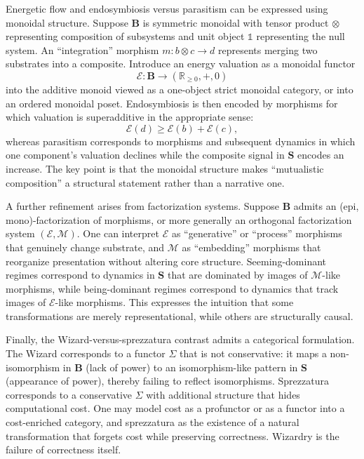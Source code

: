 \documentclass[11pt]{article}
\begin{document}
Energetic flow and endosymbiosis versus parasitism can be expressed using monoidal structure. Suppose $\mathbf{B}$ is symmetric monoidal with tensor product $\otimes$ representing composition of subsystems and unit object $\mathbb{1}$ representing the null system. An ``integration'' morphism $m:b\otimes c\to d$ represents merging two substrates into a composite. Introduce an energy valuation as a monoidal functor
\[
\mathcal{E}:\mathbf{B}\to (\mathbb{R}_{\ge 0}, +, 0)
\]
into the additive monoid viewed as a one-object strict monoidal category, or into an ordered monoidal poset. Endosymbiosis is then encoded by morphisms for which valuation is superadditive in the appropriate sense:
\[
\mathcal{E}(d) \ge \mathcal{E}(b)+\mathcal{E}(c),
\]
whereas parasitism corresponds to morphisms and subsequent dynamics in which one component’s valuation declines while the composite signal in $\mathbf{S}$ encodes an increase. The key point is that the monoidal structure makes ``mutualistic composition'' a structural statement rather than a narrative one.

A further refinement arises from factorization systems. Suppose $\mathbf{B}$ admits an (epi, mono)-factorization of morphisms, or more generally an orthogonal factorization system $(\mathcal{E},\mathcal{M})$. One can interpret $\mathcal{E}$ as ``generative'' or ``process'' morphisms that genuinely change substrate, and $\mathcal{M}$ as ``embedding'' morphisms that reorganize presentation without altering core structure. Seeming-dominant regimes correspond to dynamics in $\mathbf{S}$ that are dominated by images of $\mathcal{M}$-like morphisms, while being-dominant regimes correspond to dynamics that track images of $\mathcal{E}$-like morphisms. This expresses the intuition that some transformations are merely representational, while others are structurally causal.

Finally, the Wizard-versus-sprezzatura contrast admits a categorical formulation. The Wizard corresponds to a functor $\Sigma$ that is not conservative: it maps a non-isomorphism in $\mathbf{B}$ (lack of power) to an isomorphism-like pattern in $\mathbf{S}$ (appearance of power), thereby failing to reflect isomorphisms. Sprezzatura corresponds to a conservative $\Sigma$ with additional structure that hides computational cost. One may model cost as a profunctor or as a functor into a cost-enriched category, and sprezzatura as the existence of a natural transformation that forgets cost while preserving correctness. Wizardry is the failure of correctness itself.
\end{document}

